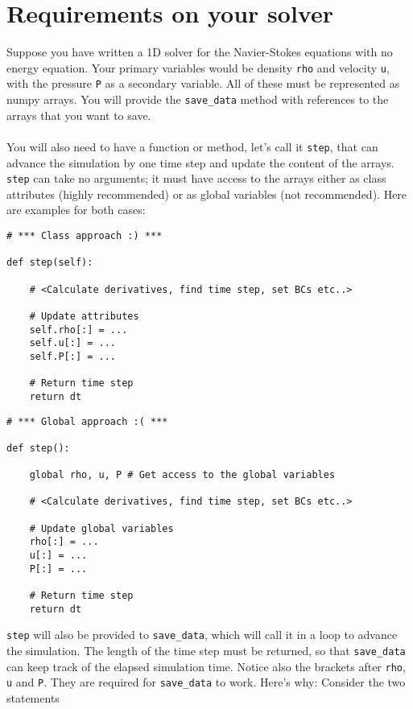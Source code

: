 \documentclass{article}
\newcommand{\ttt}[1]{\texttt{#1}}
\begin{document}
\section{Requirements on your solver}
\label{sec:req}
Suppose you have written a 1D solver for the Navier-Stokes equations with no energy equation. Your primary variables would be density \ttt{rho} and velocity \ttt{u}, with the pressure \ttt{P} as a secondary variable. All of these must be represented as numpy arrays. You will provide the \ttt{save\_data} method with references to the arrays that you want to save.\\\\You will also need to have a function or method, let's call it \ttt{step}, that can advance the simulation by one time step and update the content of the arrays. \ttt{step} can take no arguments; it must have access to the arrays either as class attributes (highly recommended) or as global variables (not recommended). Here are examples for both cases:\\
\begin{minipage}{\linewidth}
\begin{lstlisting}
# *** Class approach :) ***

def step(self):

	# <Calculate derivatives, find time step, set BCs etc..>

	# Update attributes
	self.rho[:] = ...
	self.u[:] = ...
	self.P[:] = ...

	# Return time step
	return dt
\end{lstlisting}
\end{minipage}
\begin{minipage}{\linewidth}
\begin{lstlisting}
# *** Global approach :( ***

def step():

	global rho, u, P # Get access to the global variables

	# <Calculate derivatives, find time step, set BCs etc..>

	# Update global variables
	rho[:] = ...
	u[:] = ...
	P[:] = ...

	# Return time step
	return dt
\end{lstlisting}
\end{minipage}
\ttt{step} will also be provided to \ttt{save\_data}, which will call it in a loop to advance the simulation. The length of the time step must be returned, so that \ttt{save\_data} can keep track of the elapsed simulation time. Notice also the brackets after \ttt{rho}, \ttt{u} and \ttt{P}. They are required for \ttt{save\_data} to work. Here's why: Consider the two statements
\end{document}
